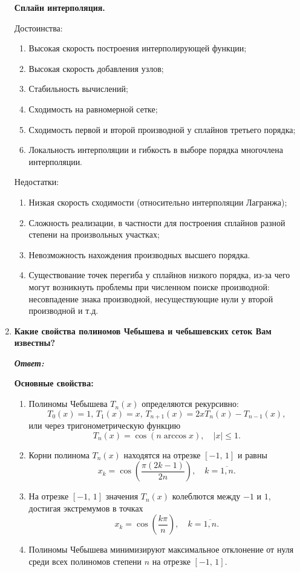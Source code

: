 \documentclass[12pt, a4paper]{article}
\newcommand{\abs}[1]{\lvert #1 \rvert}
\begin{document}
\begin{enumerate}
	\textbf{Сплайн интерполяция.}
	
	Достоинства:
	\begin{enumerate}
		\item Высокая скорость построения интерполирующей функции;
		\item Высокая скорость добавления узлов;
		\item Стабильность вычислений;
		\item Сходимость на равномерной сетке;
		\item Сходимость первой и второй производной у сплайнов третьего порядка;
		\item Локальность интерполяции и гибкость в выборе порядка многочлена интерполяции.
	\end{enumerate}
	
	Недостатки:
	\begin{enumerate}
		\item Низкая скорость сходимости (относительно интерполяции Лагранжа);
		\item Сложность реализации, в частности для построения сплайнов разной степени на произвольных участках;
		\item Невозможность нахождения производных высшего порядка.
		\item Существование точек перегиба у сплайнов низкого порядка, из-за чего могут возникнуть проблемы при численном поиске производной: несовпадение знака производной, несуществующие нули у второй производной и т.д.
	\end{enumerate}
	
	\item \textbf{Какие свойства полиномов Чебышева и чебышевских сеток Вам известны?}
	\vspace*{0.2cm}
	
	\textit{\textbf{Ответ:}}

	\textbf{Основные свойства:}
	\begin{enumerate}
		\item Полиномы Чебышева $T_n(x)$ определяются рекурсивно:
		\[
		T_0(x) = 1, \, T_1(x) = x, \, T_{n+ 1}(x) = 2x T_n(x) - T_{n - 1}(x),
		\]
		или через тригонометрическую функцию
		\[
		T_n(x) = \cos (n \arccos x), \quad \abs{x} \le 1.
		\]
		\item Корни полинома $T_n(x)$ находятся на отрезке $[-1,\,1]$	и равны
		\[
		x_k = \cos \left(\frac{\pi (2k - 1)}{2n}\right), \quad k = \overline{1,n}.
		\]
		\item На отрезке $[-1, \, 1]$ значения $T_n(x)$ колеблются между $-1$ и $1$, достигая экстремумов в точках
		\[
		x_k = \cos \left( \frac{k \pi}{n}\right), \quad k = \overline{1,n}.
		\]
		\item Полиномы Чебышева минимизируют максимальное отклонение от нуля среди всех полиномов степени $n$ на отрезке $[-1, \, 1]$.
	\end{enumerate}
	\end{enumerate}
	
\end{document}

